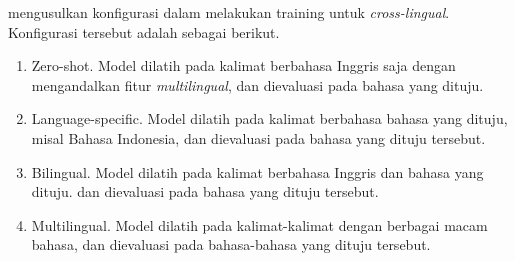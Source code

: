 \textcite{blloshmi2020} mengusulkan konfigurasi dalam melakukan training untuk \amrparsing{} \textit{cross-lingual}.
Konfigurasi tersebut adalah sebagai berikut.
\begin{enumerate}
  \item Zero-shot.
  Model dilatih pada kalimat berbahasa Inggris saja dengan mengandalkan fitur \textit{multilingual}, dan dievaluasi pada bahasa yang dituju.

  \item Language-specific.
  Model dilatih pada kalimat berbahasa bahasa yang dituju, misal Bahasa Indonesia, dan dievaluasi pada bahasa yang dituju tersebut.

  \item Bilingual.
  Model dilatih pada kalimat berbahasa Inggris dan bahasa yang dituju. dan dievaluasi pada bahasa yang dituju tersebut.

  \item Multilingual.
  Model dilatih pada kalimat-kalimat dengan berbagai macam bahasa, dan dievaluasi pada bahasa-bahasa yang dituju tersebut.
\end{enumerate}
